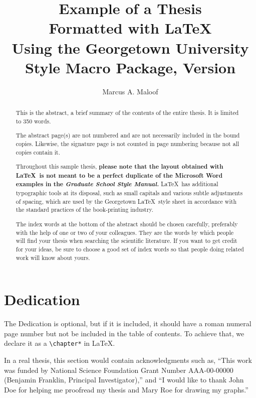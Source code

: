\documentclass[12pt]{report}
\title{Example of a Thesis \\
       Formatted with LaTeX \\
       Using the Georgetown University \\
       Style Macro Package, Version \guthesisversion}
\author{Marcus A. Maloof}
\begin{document}

\maketitle    %

\begin{abstract}
This is the abstract, a brief summary of the contents of the entire thesis.
It is limited to 350 words.

The abstract page(s) are not numbered and are not necessarily included
in the bound copies.  Likewise, the signature page is not counted in
page numbering because not all copies contain it.

Throughout this sample thesis, {\bf please note
that the layout obtained with \LaTeX\ is not meant to be a
perfect duplicate of the Microsoft Word examples in the \emph{Graduate
School Style Manual.}}  \LaTeX\ has additional typographic tools at its
disposal, such as {\sc small capitals} and various subtle adjustments
of spacing, which are used by the Georgetown \LaTeX\ style sheet in
accordance with the standard practices of the book-printing industry.

The index words at the bottom of the abstract should be chosen carefully,
preferably with the help of one or two of your colleagues.
They are the words by which people will find your thesis when searching
the scientific literature.
If you want to get credit for your ideas, be sure to choose a good set of
index words so that people doing related work will know about yours.
\end{abstract}


\chapter*{Dedication}

The Dedication is optional, but if it is included, it should have
a roman numeral page number but not be included in the table of
contents.  To achieve that, we declare it as a \verb"\chapter*" in \LaTeX.



In a real thesis, this section would contain acknowledgments such
as, ``This work was funded by National Science Foundation Grant
Number AAA-00-00000 (Benjamin Franklin, Principal Investigator),''
and ``I would like to thank John Doe for helping me proofread my
thesis and Mary Roe for drawing my graphs.''
\end{document}
